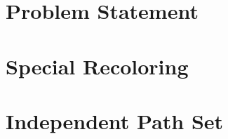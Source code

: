 \documentclass{beamer}
\begin{document}


\section{Problem Statement}



\section{Special Recoloring}






\section{Independent Path Set}

\end{document}
